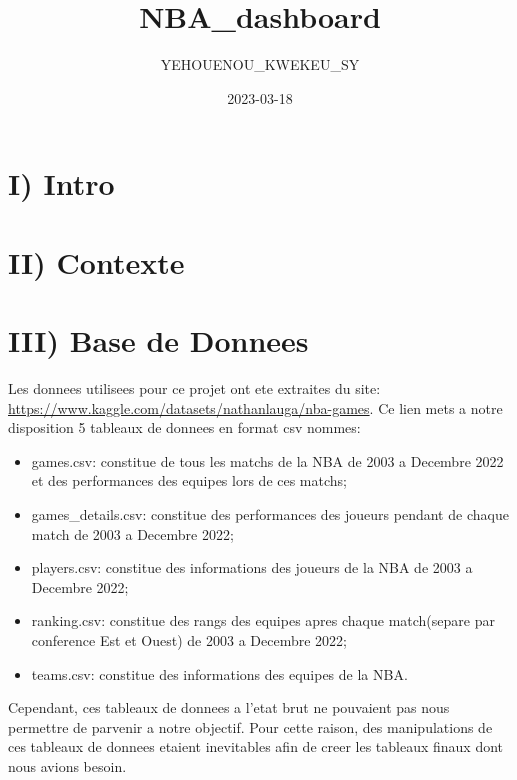 \documentclass[
]{article}
\title{NBA\_dashboard}
\author{YEHOUENOU\_KWEKEU\_SY}
\date{2023-03-18}
\providecommand{\tightlist}{%
  \setlength{\itemsep}{0pt}\setlength{\parskip}{0pt}}
\begin{document}
\maketitle

\hypertarget{i-intro}{%
\section{\texorpdfstring{\textbf{I) Intro}}{I) Intro}}\label{i-intro}}

\hypertarget{ii-contexte}{%
\section{\texorpdfstring{\textbf{II)
Contexte}}{II) Contexte}}\label{ii-contexte}}

\hypertarget{iii-base-de-donnees}{%
\section{\texorpdfstring{\textbf{III) Base de
Donnees}}{III) Base de Donnees}}\label{iii-base-de-donnees}}

Les donnees utilisees pour ce projet ont ete extraites du site:
\url{https://www.kaggle.com/datasets/nathanlauga/nba-games}. Ce lien
mets a notre disposition 5 tableaux de donnees en format csv nommes:

\begin{itemize}
\tightlist
\item
  games.csv: constitue de tous les matchs de la NBA de 2003 a Decembre
  2022 et des performances des equipes lors de ces matchs;
\item
  games\_details.csv: constitue des performances des joueurs pendant de
  chaque match de 2003 a Decembre 2022;
\item
  players.csv: constitue des informations des joueurs de la NBA de 2003
  a Decembre 2022;
\item
  ranking.csv: constitue des rangs des equipes apres chaque match(separe
  par conference Est et Ouest) de 2003 a Decembre 2022;
\item
  teams.csv: constitue des informations des equipes de la NBA.
\end{itemize}

Cependant, ces tableaux de donnees a l'etat brut ne pouvaient pas nous
permettre de parvenir a notre objectif. Pour cette raison, des
manipulations de ces tableaux de donnees etaient inevitables afin de
creer les tableaux finaux dont nous avions besoin.
\end{document}
